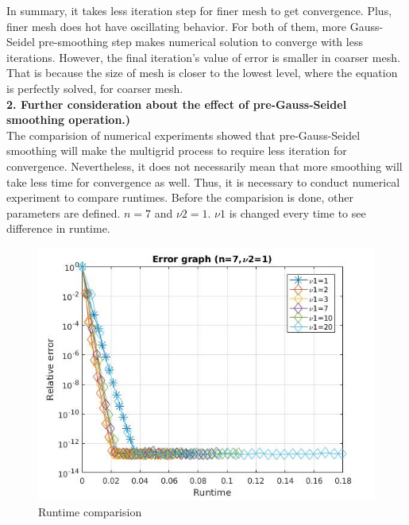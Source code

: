 \documentclass[12pt]{article}
\begin{document}
In summary, it takes less iteration step for finer mesh to get convergence. Plus, finer mesh does hot have oscillating behavior. For both of them, more Gauss-Seidel pre-smoothing step makes numerical solution to converge with less iterations. However, the final iteration's value of error is smaller in coarser mesh. That is because the size of mesh is closer to the lowest level, where the equation is perfectly solved, for coarser mesh. 
\\






\textbf{2. Further consideration about the effect of pre-Gauss-Seidel smoothing operation.)}
\\

The comparision of numerical experiments showed that pre-Gauss-Seidel smoothing will make the multigrid process to require less iteration for convergence. Nevertheless, it does not necessarily mean that more smoothing will take less time for convergence as well. Thus, it is necessary to conduct numerical experiment to compare runtimes. Before the comparision is done, other parameters are defined. $n=7$ and $\nu2=1$. $\nu1$ is changed every time to see difference in runtime.

\begin{figure}[H]
\centering
\includegraphics[scale=0.7]{runtime.jpg}
\caption{Runtime comparision}
\end{figure}
\end{document}
